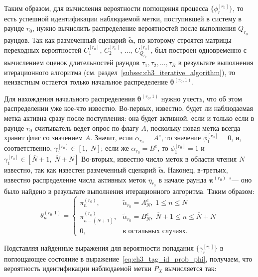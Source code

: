 Таким образом, для вычисления вероятности поглощения процесса $\{ \phi_r^{[r_0]} \}$, то есть успешной идентификации наблюдаемой метки, поступившей в систему в раунде $r_0$, нужно вычислить распределение вероятностей после выполнения $Q_{r_0}$ раундов. Так как размеченный сценарий $\widetilde{\bm{\alpha}}$, по которому строятся матрицы переходных вероятностей $C^{[r_0]}_1$, $C^{[r_0]}_2$, $\dots$, $C^{[r_0]}_{Q_{r_0}}$, был построен одновременно с вычислением оценок длительностей раундов $\tau_1, \tau_2, \dots, \tau_R$ в результате выполнения итерационного алгоритма (см. раздел~\ref{subsec:ch3_iterative_algorithm}), то неизвстным остается только начальное распределение $\bm{\theta}^{(r_0, 1)}$.

Для нахождения начального распределения $\bm{\theta}^{(r_0,1)}$ нужно учесть, что об этом распределении уже кое-что известно. Во-первых, известно, будет ли наблюдаемая метка активна сразу после поступления: она будет активной, если и только если в раунде $r_0$ считыватель ведет опрос по флагу $A$, поскольку новая метка всегда хранит флаг со значением $A$. Значит, если $\alpha_{r_0} = A^{e}$, то значение $\phi_1^{[r_0]} = 0$, и, соответственно, $\gamma_1^{[r_0]} \in [1,\; N]$; если же $\alpha_{r_0} = B^{e}$, то $\phi_1^{[r_0]} = 1$ и $\gamma_1^{[r_0]} \in [\overline{N} + 1,\; \overline{N} + N]$ Во-вторых, известно число меток в области чтения $N$ известно, так как известен размеченный сценарий $\widetilde{\bm{\alpha}}$. Наконец, в-третьих, известно распределение числа активных меток $\eta_{r_0}$ в начале раунда $\bm{\pi}^{(r_0)}$ "--- оно было найдено в результате выполнения итерационного алгоритма. Таким образом:
\begin{equation}\label{eq:ch3_fg_initial_prob}
	\theta_n^{(r_0,1)} = \begin{cases}
		\pi^{(r_0)}_n,                      &\widetilde{\alpha}_{r_0} = A^e_N,\; 1 \leqslant n \leqslant N\\
		\pi^{(r_0)}_{n - (\overline{N}+1)}, &\widetilde{\alpha}_{r_0} = B^e_N,\; \overline{N}+1 \leqslant n \leqslant \overline{N}+N\\
		0,                                  &\text{в остальных случаях.}
	\end{cases}
\end{equation}

Подставляя найденные выражения для вероятности попадания $\{ \gamma_r^{[r_0]} \}$ в поглощающее состояние в выражение~\eqref{eq:ch3_tag_id_prob_phi}, получаем, что вероятность идентификации наблюдаемой метки $P_X$ вычисляется так:

